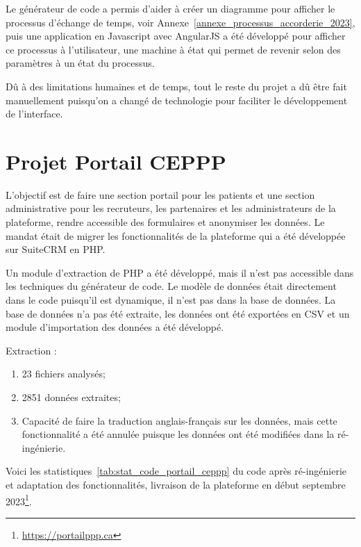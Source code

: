 Le générateur de code a permis d’aider à créer un diagramme pour afficher le processus d’échange de temps, voir Annexe~\ref{annexe_processus_accorderie_2023}, puis une application en Javascript avec AngularJS a été développé pour afficher ce processus à l’utilisateur, une machine à état qui permet de revenir selon des paramètres à un état du processus.

Dû à des limitations humaines et de temps, tout le reste du projet a dû être fait manuellement puisqu’on a changé de technologie pour faciliter le développement de l’interface.

\section{Projet Portail CEPPP}

L'objectif est de faire une section portail pour les patients et une section administrative pour les recruteurs, les partenaires et les administrateurs de la plateforme, rendre accessible des formulaires et anonymiser les données. Le mandat était de migrer les fonctionnalités de la plateforme qui a été développée sur SuiteCRM en PHP.

Un module d'extraction de PHP a été développé, mais il n'est pas accessible dans les techniques du générateur de code. Le modèle de données était directement dans le code puisqu'il est dynamique, il n'est pas dans la base de données. La base de données n'a pas été extraite, les données ont été exportées en CSV et un module d'importation des données a été développé.

Extraction : 
\begin{enumerate}
    \item 23 fichiers analysés;
    \item 2851 données extraites;
    \item Capacité de faire la traduction anglais-français sur les données, mais cette fonctionnalité a été annulée puisque les données ont été modifiées dans la ré-ingénierie.
\end{enumerate}

Voici les statistiques~\ref{tab:stat_code_portail_ceppp} du code après ré-ingénierie et adaptation des fonctionnalités, livraison de la plateforme en début septembre 2023\footnote{\url{https://portailppp.ca}}.

